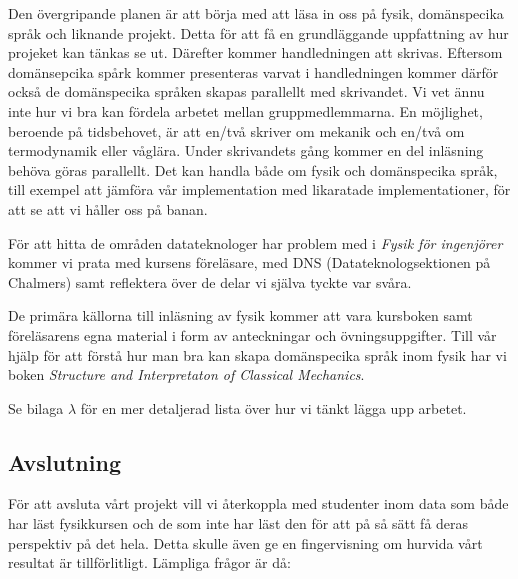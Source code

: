 \documentclass[12pt,a4paper]{article}
\begin{document}
Den övergripande planen är att börja med att läsa in oss på fysik, domänspecika språk och liknande projekt. Detta för att få en grundläggande uppfattning av hur projeket kan tänkas se ut. Därefter kommer handledningen att skrivas. Eftersom domänsepcika spårk kommer presenteras varvat i handledningen kommer därför också de domänspecika språken skapas parallellt med skrivandet. Vi vet ännu inte hur vi bra kan fördela arbetet mellan gruppmedlemmarna. En möjlighet, beroende på tidsbehovet, är att en/två skriver om mekanik och en/två om termodynamik eller våglära. Under skrivandets gång kommer en del inläsning behöva göras parallellt. Det kan handla både om fysik och domänspecika språk, till exempel att jämföra vår implementation med likaratade implementationer, för att se att vi håller oss på banan.

För att hitta de områden datateknologer har problem med i \textit{Fysik för ingenjörer} kommer vi prata med kursens föreläsare, med DNS (Datateknologsektionen på Chalmers) samt reflektera över de delar vi själva tyckte var svåra.

De primära källorna till inläsning av fysik kommer att vara kursboken samt föreläsarens egna material i form av anteckningar och övningsuppgifter. Till vår hjälp för att förstå hur man bra kan skapa domänspecika språk inom fysik har vi boken \textit{Structure and Interpretaton of Classical Mechanics}\cite{SICM}.

Se bilaga $\lambda$ för en mer detaljerad lista över hur vi tänkt lägga upp arbetet.


\subsection{Avslutning}

För att avsluta vårt projekt vill vi återkoppla med studenter inom data som både har läst fysikkursen och de som inte har läst den för att på så sätt få deras perspektiv på det hela. Detta skulle även ge en fingervisning om hurvida vårt resultat är tillförlitligt. Lämpliga frågor är då:
\end{document}
